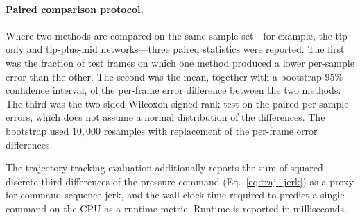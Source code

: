 \paragraph{Paired comparison protocol.}
Where two methods are compared on the same sample set---for example, the tip-only and tip-plus-mid networks---three paired statistics were reported. The first was the fraction of test frames on which one method produced a lower per-sample error than the other. The second was the mean, together with a bootstrap $95\%$ confidence interval, of the per-frame error difference between the two methods. The third was the two-sided Wilcoxon signed-rank test on the paired per-sample errors, which does not assume a normal distribution of the differences. The bootstrap used $10{,}000$ resamples with replacement of the per-frame error differences.

The trajectory-tracking evaluation additionally reports the sum of squared discrete third differences of the pressure command (Eq.~\ref{eq:traj_jerk}) as a proxy for command-sequence jerk, and the wall-clock time required to predict a single command on the CPU as a runtime metric. Runtime is reported in milliseconds.
